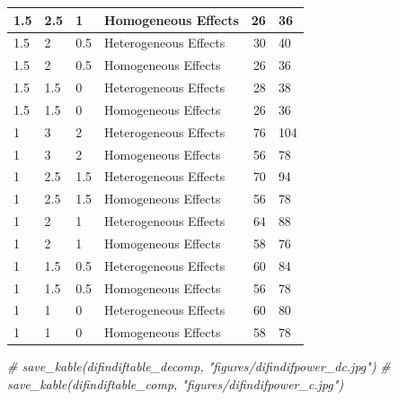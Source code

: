 \documentclass[
]{article}
\newenvironment{Shaded}{\begin{snugshade}}{\end{snugshade}}
\newcommand{\CommentTok}[1]{\textcolor[rgb]{0.56,0.35,0.01}{\textit{#1}}}
\begin{document}
\begin{table}[H]
\begin{tabular}{l|l|l|l|r|l}
\hspace{1em}1.5 & 2.5 & 1 & Homogeneous Effects & 26 & 36\\
\hline
\hspace{1em}1.5 & 2 & 0.5 & Heterogeneous Effects & 30 & 40\\
\hline
\hspace{1em}1.5 & 2 & 0.5 & Homogeneous Effects & 26 & 36\\
\hline
\hspace{1em}1.5 & 1.5 & 0 & Heterogeneous Effects & 28 & 38\\
\hline
\hspace{1em}1.5 & 1.5 & 0 & Homogeneous Effects & 26 & 36\\
\hline
\hspace{1em}1 & 3 & 2 & Heterogeneous Effects & 76 & 104\\
\hline
\hspace{1em}1 & 3 & 2 & Homogeneous Effects & 56 & 78\\
\hline
\hspace{1em}1 & 2.5 & 1.5 & Heterogeneous Effects & 70 & 94\\
\hline
\hspace{1em}1 & 2.5 & 1.5 & Homogeneous Effects & 56 & 78\\
\hline
\hspace{1em}1 & 2 & 1 & Heterogeneous Effects & 64 & 88\\
\hline
\hspace{1em}1 & 2 & 1 & Homogeneous Effects & 58 & 76\\
\hline
\hspace{1em}1 & 1.5 & 0.5 & Heterogeneous Effects & 60 & 84\\
\hline
\hspace{1em}1 & 1.5 & 0.5 & Homogeneous Effects & 56 & 78\\
\hline
\hspace{1em}1 & 1 & 0 & Heterogeneous Effects & 60 & 80\\
\hline
\hspace{1em}1 & 1 & 0 & Homogeneous Effects & 58 & 78\\
\hline
\end{tabular}
\end{table}

\begin{Shaded}
\begin{Highlighting}[]
\CommentTok{\# save\_kable(difindiftable\_decomp, "figures/difindifpower\_dc.jpg")}
\CommentTok{\# save\_kable(difindiftable\_comp, "figures/difindifpower\_c.jpg")}
\end{Highlighting}
\end{Shaded}
\end{document}
